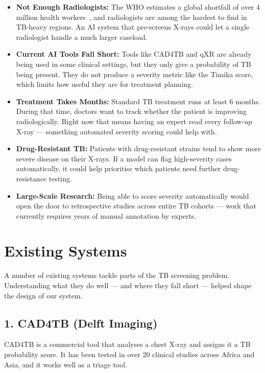 \documentclass[12pt]{report}
\begin{document}
\begin{itemize}
    \item \textbf{Not Enough Radiologists:} The WHO estimates a global shortfall of over 4 million health workers~\cite{ref10}, and radiologists are among the hardest to find in TB-heavy regions. An AI system that pre-screens X-rays could let a single radiologist handle a much larger caseload.

    \item \textbf{Current AI Tools Fall Short:} Tools like CAD4TB and qXR are already being used in some clinical settings, but they only give a probability of TB being present. They do not produce a severity metric like the Timika score, which limits how useful they are for treatment planning.

    \item \textbf{Treatment Takes Months:} Standard TB treatment runs at least 6 months. During that time, doctors want to track whether the patient is improving radiologically. Right now that means having an expert read every follow-up X-ray --- something automated severity scoring could help with.

    \item \textbf{Drug-Resistant TB:} Patients with drug-resistant strains tend to show more severe disease on their X-rays. If a model can flag high-severity cases automatically, it could help prioritise which patients need further drug-resistance testing.

    \item \textbf{Large-Scale Research:} Being able to score severity automatically would open the door to retrospective studies across entire TB cohorts --- work that currently requires years of manual annotation by experts.
\end{itemize}

\section{Existing Systems}

A number of existing systems tackle parts of the TB screening problem. Understanding what they do well --- and where they fall short --- helped shape the design of our system.

\subsection*{1. CAD4TB (Delft Imaging)}
CAD4TB is a commercial tool that analyses a chest X-ray and assigns it a TB probability score. It has been tested in over 20 clinical studies across Africa and Asia, and it works well as a triage tool.
\end{document}
